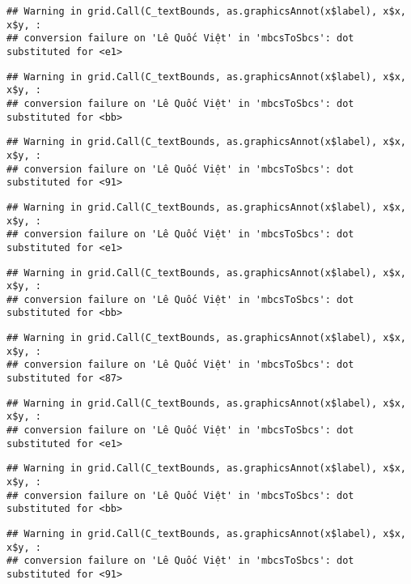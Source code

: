 \documentclass[
]{article}
\begin{document}
\begin{verbatim}
## Warning in grid.Call(C_textBounds, as.graphicsAnnot(x$label), x$x, x$y, :
## conversion failure on 'Lê Quốc Việt' in 'mbcsToSbcs': dot substituted for <e1>
\end{verbatim}

\begin{verbatim}
## Warning in grid.Call(C_textBounds, as.graphicsAnnot(x$label), x$x, x$y, :
## conversion failure on 'Lê Quốc Việt' in 'mbcsToSbcs': dot substituted for <bb>
\end{verbatim}

\begin{verbatim}
## Warning in grid.Call(C_textBounds, as.graphicsAnnot(x$label), x$x, x$y, :
## conversion failure on 'Lê Quốc Việt' in 'mbcsToSbcs': dot substituted for <91>
\end{verbatim}

\begin{verbatim}
## Warning in grid.Call(C_textBounds, as.graphicsAnnot(x$label), x$x, x$y, :
## conversion failure on 'Lê Quốc Việt' in 'mbcsToSbcs': dot substituted for <e1>
\end{verbatim}

\begin{verbatim}
## Warning in grid.Call(C_textBounds, as.graphicsAnnot(x$label), x$x, x$y, :
## conversion failure on 'Lê Quốc Việt' in 'mbcsToSbcs': dot substituted for <bb>
\end{verbatim}

\begin{verbatim}
## Warning in grid.Call(C_textBounds, as.graphicsAnnot(x$label), x$x, x$y, :
## conversion failure on 'Lê Quốc Việt' in 'mbcsToSbcs': dot substituted for <87>
\end{verbatim}

\begin{verbatim}
## Warning in grid.Call(C_textBounds, as.graphicsAnnot(x$label), x$x, x$y, :
## conversion failure on 'Lê Quốc Việt' in 'mbcsToSbcs': dot substituted for <e1>
\end{verbatim}

\begin{verbatim}
## Warning in grid.Call(C_textBounds, as.graphicsAnnot(x$label), x$x, x$y, :
## conversion failure on 'Lê Quốc Việt' in 'mbcsToSbcs': dot substituted for <bb>
\end{verbatim}

\begin{verbatim}
## Warning in grid.Call(C_textBounds, as.graphicsAnnot(x$label), x$x, x$y, :
## conversion failure on 'Lê Quốc Việt' in 'mbcsToSbcs': dot substituted for <91>
\end{verbatim}
\end{document}
